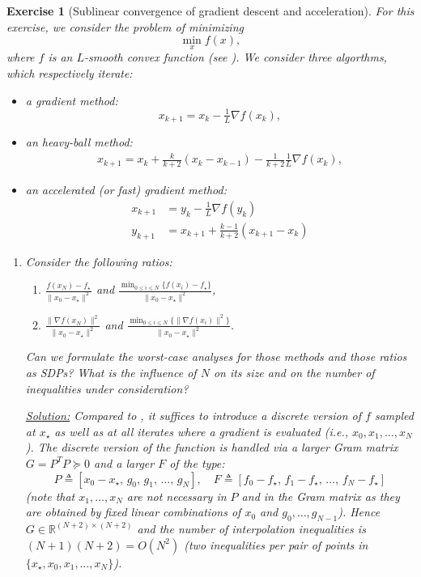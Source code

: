 \documentclass[11pt,a4paper]{article}
\newcommand{\correction}[1]{{{\color{blue}\underline{Solution:} #1}}}
\newcommand{\correction}[1]{}
\newtheorem{exercise}{Exercise}
\begin{document}
	\begin{exercise}[Sublinear convergence of gradient descent and acceleration]\label{ex:accel1}
	For this exercise, we consider the problem of minimizing
	\[\min_{x} f(x),\]
	where $f$ is an $L$-smooth convex function (see ). We consider three algorthms, which respectively iterate:
	\begin{itemize}
	\item a gradient method:
	\[x_{k+1}=x_k-\tfrac{1}{L} \nabla f(x_k),\]
	\item an heavy-ball method:
	\begin{equation*}
	\begin{aligned}
	x_{k+1}=x_{k}+\tfrac{k}{k+2} (x_{k}-x_{k-1})-\tfrac{1}{k+2}\tfrac{1}{L} \nabla f(x_{k}),
	\end{aligned}
	\end{equation*}
	\item an accelerated (or fast) gradient method:
	\begin{equation*}
	\begin{aligned}
	x_{k+1}&=y_k-\tfrac{1}{L}\nabla f(y_k)\\
	y_{k+1}&=x_{k+1}+\tfrac{k-1}{k+2}(x_{k+1}-x_k)
	\end{aligned}
	\end{equation*}
	\end{itemize}
	\begin{enumerate}
	\item Consider the following ratios:
	\begin{enumerate}
	\item $\frac{f(x_N)-f_\star}{\|x_0-x_\star\|^2}$ and $\frac{\min_{0\leqslant i\leqslant N}\{f(x_i)-f_\star\}}{\|x_0-x_\star\|^2}$,
	\item $\frac{\|\nabla f(x_N)\|^2}{\|x_0-x_\star\|^2}$ and $\frac{\min_{0\leqslant i\leqslant N}\{\|\nabla f(x_i)\|^2\}}{\|x_0-x_\star\|^2}$.
	\end{enumerate}
	Can we formulate the worst-case analyses for those methods and those ratios as SDPs? What is the influence of $N$ on its size and on the number of inequalities under consideration?
	
	\correction{Compared to , it suffices to introduce a discrete version of $f$ sampled at $x_\star$ as well as at all iterates where a gradient is evaluated (i.e., $x_0,x_1,\ldots,x_N$). The discrete version of the function is handled via a larger Gram matrix $G=P^T P\succcurlyeq 0$ and a larger $F$ of the type:
	\[ P \triangleq [x_0-x_\star,\,g_0,\,g_1,\,\ldots,\,g_N],\quad F \triangleq [f_0-f_\star,\,f_1-f_\star,\,\ldots,\,f_N-f_\star]\]
	(note that $x_1,\ldots,x_N$ are not necessary in $P$ and in the Gram matrix as they are obtained by fixed linear combinations of $x_0$ and $g_0,\ldots,g_{N-1}$). Hence $G\in\mathbb{R}^{(N+2)\times (N+2)}$ and the number of interpolation inequalities is $(N+1) (N+2)=O(N^2)$ (two inequalities per pair of points in $\{x_\star,x_0,x_1,\ldots,x_N\}$).
	
}
\end{enumerate}
\end{exercise}
\end{document}
